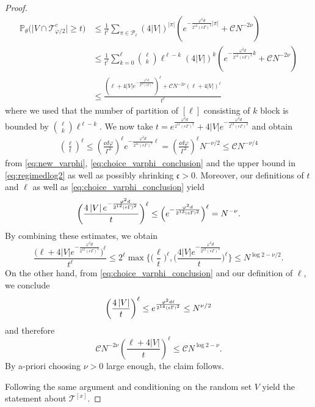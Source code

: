 \documentclass[11pt]{article}
\newcommand{\abs}[1]{\left| #1 \right|}
\newcommand{\absn}[1]{\bigl| #1 \bigr|} %
\newcommand{\ccc}{\mathfrak{c}}
\theoremstyle{plain}
\theoremstyle{remark}
\numberwithin{equation}{section}
\newcommand{\nc}{\normalcolor}
\begin{document}
\begin{proof}
		\begin{align*}
			\mathbb{P}_{\theta} \big( \absn{V\cap \mathcal{T}_{\varphi/2}^c} \ge t \big) &\le \frac{1}{t^{\ell}} \sum_{\pi \in \mathcal{P}_{\ell}}  (4\abs{V})^{\abs{\pi}} \left(  e^{-\frac{\varphi^2d}{2^{12} (e\Gamma)^2}|\pi|} + \mathcal{C}N^{-2 \nu}\right) \\
		&\le  \frac{1}{t^{\ell}} \sum_{ k=0}^\ell \binom{\ell}{k} \ell^{\ell-k}(4\abs{V})^{k} \left(  e^{-\frac{\varphi^2d}{2^{12} (e\Gamma)^2}k}  + \mathcal{C}N^{- 2\nu}\right)\\
			&\le \frac{ \left( \ell +  4\abs{V} e^{-\frac{\varphi^2d}{2^{12} (e\Gamma)^2}}  \right)^\ell + \mathcal{C} N^{-2\nu}\left(\ell +  4 \abs{V} \right)^\ell}{t^\ell}
		\end{align*}
		where we used that the number of partition of $[\ell]$ consisting of $k$ block is bounded by $\binom{\ell}{k}\ell^{\ell-k}$. We now take $t = e^{\frac{\varphi^2d}{2^{14} (e\Gamma)^2}}  + 4\abs{V} e^{-\frac{\varphi^2d}{2^{13} (e\Gamma)^2}} $ and obtain
		\begin{align*}
			\left( \frac{\ell}{t} \right)^{\ell} \le \left(\frac{\ccc d\varphi}{\Gamma^3}\right)^\ell e^{-\frac{\varphi^2d }{2^{14}(e\Gamma)^2} \ell } = \left(\frac{\ccc d\varphi}{\Gamma^3}\right)^\ell N^{-\nu/2} \le \mathcal C N^{-\nu/4}
		\end{align*}
		 from \cref{eq:new_varphi},  \cref{eq:choice_varphi_conclusion} 
		 and the upper bound in \cref{eq:regimedlog2} as well as possibly shrinking $\ccc>0$. Moreover, our  definitions of $t$ and $\ell$ as well as \cref{eq:choice_varphi_conclusion} yield \begin{align*}
		\biggl(	\frac{ 4\abs{V} e^{-\frac{\varphi^2d}{2^{12} (e\Gamma)^2}} }{t} \biggr)^\ell \le \Bigl(e^{-\frac{\varphi^2d}{2^{13} (e\Gamma)^2}}\Bigr)^\ell = N^{-\nu}.
		\end{align*}
		By combining these estimates, we obtain 
		\begin{equation*}
			\frac{ \big( \ell + 4\abs{V} e^{-\frac{\varphi^2d}{2^{12} (e\Gamma)^2}}  \big)^\ell}{t^\ell} \le 2^\ell \max \bigg\{ \bigg(\frac{\ell}{t}\bigg)^\ell, \bigg( \frac{ 4\abs{V} e^{-\frac{\varphi^2d}{2^{12} (e\Gamma)^2}} }{t}\bigg)^{\ell}\bigg\}  \le N^{ \log 2 - \nu/2}.
		\end{equation*}
		On the other hand, from \cref{eq:choice_varphi_conclusion} and our definition of $\ell$, we conclude 
		\begin{equation*}
			\left( \frac{ 4 \nc \abs{V}}{t} \right)^{\ell} \le e^{\frac{\varphi^2d \ell}{2^{14} (e\Gamma)^2}}  \le N^{\nu/2}
		\end{equation*}
		and therefore
		\begin{equation*}
			\mathcal{C} N^{-2\nu} \left( \frac{\ell + 4\abs{V}}{t}\right)^{\ell}\le \mathcal{C} N^{\log 2 - \nu}.
		\end{equation*}
		By a-priori choosing $\nu>0$ large enough, the claim follows. 
	 
	 Following the same argument and conditioning on the random set $V$ yield the statement about $\mathcal T^{[x]}$.
	\end{proof}
\end{document}

